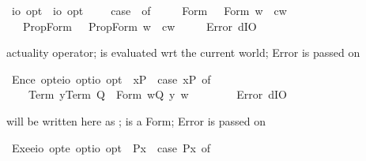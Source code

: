 \begin{isabellebody}
\isamarkuptrue%
\isamarkupfalse%
\ {\isasymA}{\isacharcolon}{\isacharcolon}{\isachardoublequoteopen}io\ opt\ {\isasymRightarrow}\ io\ opt{\isachardoublequoteclose}\ \ {\isachardoublequoteopen}{\isasymA}\ {\isasymphi}\ {\isasymequiv}\ case\ {\isasymphi}\ of\ \isanewline
\ \ \ \ Form\ {\isasympsi}\ {\isasymRightarrow}\ Form\ {\isacharparenleft}{\isasymlambda}w{\isachardot}\ {\isasympsi}\ cw{\isacharparenright}\isanewline
\ \ {\isacharbar}\ PropForm\ {\isasympsi}\ {\isasymRightarrow}\ PropForm\ {\isacharparenleft}{\isasymlambda}w{\isachardot}\ {\isasympsi}\ cw{\isacharparenright}\isanewline
\ \ {\isacharbar}\ {\isacharunderscore}\ {\isasymRightarrow}\ Error\ dIO{\isachardoublequoteclose}%
\begin{isamarkuptext}%
actuality operator; \isa{{\isasymphi}} is evaluated wrt the current world; Error is passed on%
\end{isamarkuptext}%
\isamarkuptrue%
\isamarkupfalse%
\ Enc{\isacharcolon}{\isacharcolon}{\isachardoublequoteopen}e\ opt{\isasymRightarrow}{\isacharparenleft}e{\isasymRightarrow}io{\isacharparenright}\ opt{\isasymRightarrow}io\ opt{\isachardoublequoteclose}\ \ {\isachardoublequoteopen}{\isacharless}x{\isasymcirc}P{\isachargreater}\ {\isasymequiv}\ case\ {\isacharparenleft}x{\isacharcomma}P{\isacharparenright}\ of\ \isanewline
\ \ \ \ {\isacharparenleft}Term\ y{\isacharcomma}Term\ Q{\isacharparenright}\ {\isasymRightarrow}\ Form\ {\isacharparenleft}{\isasymlambda}w{\isachardot}{\isacharparenleft}Q\ y{\isacharparenright}\ w{\isacharparenright}\ \ \ \isanewline
\ \ {\isacharbar}\ {\isacharparenleft}{\isacharunderscore}{\isacharcomma}{\isacharunderscore}{\isacharparenright}\ {\isasymRightarrow}\ Error\ dIO{\isachardoublequoteclose}%
\begin{isamarkuptext}%
 will be written here as ;  is a Form; Error is passed on%
\end{isamarkuptext}%
\isamarkuptrue%
\isamarkupfalse%
\ Exe{}{\isacharcolon}{\isacharcolon}{\isachardoublequoteopen}{\isacharparenleft}e{\isasymRightarrow}io{\isacharparenright}\ opt{\isasymRightarrow}e\ opt{\isasymRightarrow}io\ opt{\isachardoublequoteclose}\ \ {\isachardoublequoteopen}{\isacharless}P{\isasymbullet}x{\isachargreater}\ {\isasymequiv}\ case\ {\isacharparenleft}P{\isacharcomma}x{\isacharparenright}\ of\ \isanewline

\end{isabellebody}
